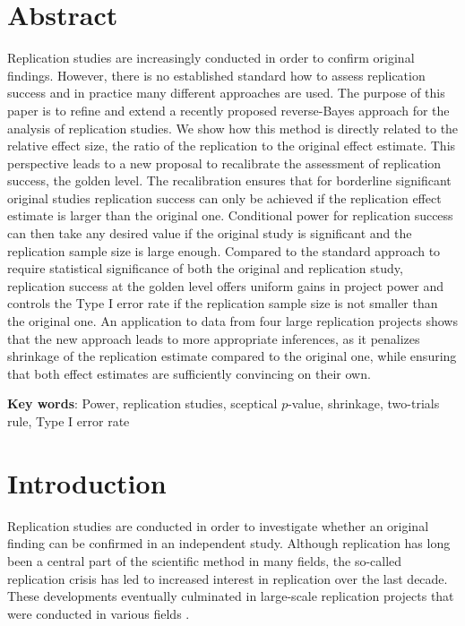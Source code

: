 \section*{Abstract}
Replication studies are increasingly conducted in order to confirm original
findings. However, there is no established standard how to assess replication
success and in practice many different approaches are used. The purpose of this
paper is to refine and extend a recently proposed reverse-Bayes approach for the
analysis of replication studies. We show how this method is directly related to
the relative effect size, the ratio of the replication to the original effect
estimate. This perspective leads to a new proposal to recalibrate the assessment
of replication success, the golden level. The recalibration ensures that for
borderline significant original studies replication success can only be achieved
if the replication effect estimate is larger than the original one. Conditional
power for replication success can then take any desired value if the original
study is significant and the replication sample size is large enough. Compared
to the standard approach to require statistical significance of both the
original and replication study, replication success at the golden level offers
uniform gains in project power and controls the Type I error rate if the
replication sample size is not smaller than the original one. An application to
data from four large replication projects shows that the new approach leads to
more appropriate inferences, as it penalizes shrinkage of the replication
estimate compared to the original one, while ensuring that both effect estimates
are sufficiently convincing on their own.

\textbf{Key words}: Power, replication studies, sceptical $p$-value, shrinkage,
two-trials rule, Type I error rate

\section{Introduction}
Replication studies are conducted in order to investigate whether an original
finding can be confirmed in an independent study. Although replication has long
been a central part of the scientific method in many fields, the so-called
replication crisis \citep{Ioannidis2005, Begley2015} has led to increased
interest in replication over the last decade. These developments eventually
culminated in large-scale replication projects that were conducted in various
fields \citep{Errington2014, Klein2014, Opensc2015, Ebersole2016, Camerer2016,
  Camerer2018, Cova2018, Klein2018}.

